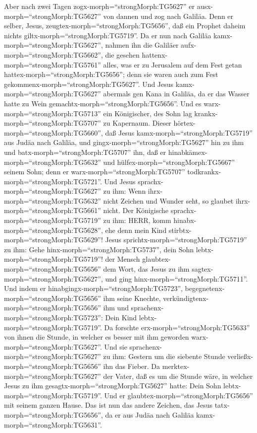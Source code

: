  Aber nach zwei Tagen zogx-morph=``strongMorph:TG5627'' er
ausx-morph=``strongMorph:TG5627'' von dannen und zog nach Galiläa.
 Denn er selber, Jesus,
zeugtex-morph=``strongMorph:TG5656'', daß ein Prophet daheim nichts
giltx-morph=``strongMorph:TG5719''.  Da er nun nach Galiläa
kamx-morph=``strongMorph:TG5627'', nahmen ihn die Galiläer
aufx-morph=``strongMorph:TG5662'', die gesehen
hattenx-morph=``strongMorph:TG5761'' alles, was er zu Jerusalem auf dem
Fest getan hattex-morph=``strongMorph:TG5656''; denn sie waren auch zum
Fest gekommenx-morph=``strongMorph:TG5627''.  Und Jesus
kamx-morph=``strongMorph:TG5627'' abermals gen Kana in Galiläa, da er
das Wasser hatte zu Wein gemachtx-morph=``strongMorph:TG5656''.
 Und es warx-morph=``strongMorph:TG5713'' ein Königischer,
des Sohn lag krankx-morph=``strongMorph:TG5707'' zu Kapernaum. Dieser
hörtex-morph=``strongMorph:TG5660'', daß Jesus
kamx-morph=``strongMorph:TG5719'' aus Judäa nach Galiläa, und
gingx-morph=``strongMorph:TG5627'' hin zu ihm und
batx-morph=``strongMorph:TG5707'' ihn, daß er
hinabkämex-morph=``strongMorph:TG5632'' und
hülfex-morph=``strongMorph:TG5667'' seinem Sohn; denn er
warx-morph=``strongMorph:TG5707''
todkrankx-morph=``strongMorph:TG5721''.  Und Jesus
sprachx-morph=``strongMorph:TG5627'' zu ihm: Wenn
ihrx-morph=``strongMorph:TG5632'' nicht Zeichen und Wunder seht, so
glaubet ihrx-morph=``strongMorph:TG5661'' nicht.  Der
Königische sprachx-morph=``strongMorph:TG5719'' zu ihm: HERR, komm
hinabx-morph=``strongMorph:TG5628'', ehe denn mein Kind
stirbtx-morph=``strongMorph:TG5629''!  Jesus
sprichtx-morph=``strongMorph:TG5719'' zu ihm: Gehe
hinx-morph=``strongMorph:TG5737'', dein Sohn
lebtx-morph=``strongMorph:TG5719''! der Mensch
glaubtex-morph=``strongMorph:TG5656'' dem Wort, das Jesus zu ihm
sagtex-morph=``strongMorph:TG5627'', und ging
hinx-morph=``strongMorph:TG5711''.  Und indem er
hinabgingx-morph=``strongMorph:TG5723'',
begegnetenx-morph=``strongMorph:TG5656'' ihm seine Knechte,
verkündigtenx-morph=``strongMorph:TG5656'' ihm und
sprachenx-morph=``strongMorph:TG5723'': Dein Kind
lebtx-morph=``strongMorph:TG5719''.  Da forschte
erx-morph=``strongMorph:TG5633'' von ihnen die Stunde, in welcher es
besser mit ihm geworden warx-morph=``strongMorph:TG5627''. Und sie
sprachenx-morph=``strongMorph:TG5627'' zu ihm: Gestern um die siebente
Stunde verließx-morph=``strongMorph:TG5656'' ihn das Fieber.
 Da merktex-morph=``strongMorph:TG5627'' der Vater, daß es
um die Stunde wäre, in welcher Jesus zu ihm
gesagtx-morph=``strongMorph:TG5627'' hatte: Dein Sohn
lebtx-morph=``strongMorph:TG5719''. Und er
glaubtex-morph=``strongMorph:TG5656'' mit seinem ganzen Hause.
 Das ist nun das andere Zeichen, das Jesus
tatx-morph=``strongMorph:TG5656'', da er aus Judäa nach Galiläa
kamx-morph=``strongMorph:TG5631''.

